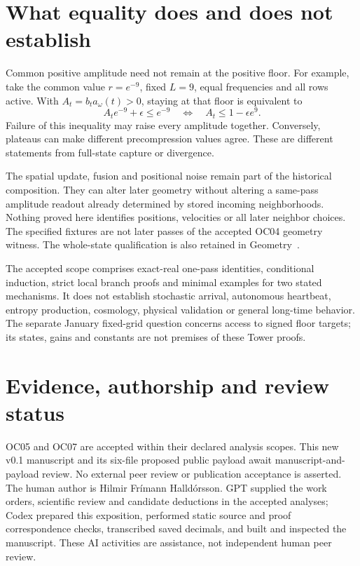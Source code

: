 \documentclass[11pt,a4paper]{article}
\theoremstyle{definition}
\theoremstyle{remark}\newtheorem{remark}[theorem]{Remark}
\numberwithin{equation}{section}
\begin{document}
\section{What equality does and does not establish}\label{sec:limits}
Common positive amplitude need not remain at the positive floor. For example, take
the common value $r=e^{-9}$, fixed $L=9$, equal frequencies and all rows active.
With $A_t=b_ta_\omega(t)>0$, staying at that floor is equivalent to
\begin{equation}\label{eq:floorstay}
 A_t e^{-9}+\epsilon\leq e^{-9}
 \quad\Longleftrightarrow\quad A_t\leq1-\epsilon e^9 .
\end{equation}
Failure of this inequality may raise every amplitude together.
Conversely, plateaus can make different precompression values agree.
These are different statements from full-state capture or divergence.

The spatial update, fusion and positional noise remain part of the historical
composition. They can alter later geometry without altering a same-pass amplitude
readout already determined by stored incoming neighborhoods. Nothing proved here
identifies positions, velocities or all later neighbor choices.
The specified fixtures are not later passes of the accepted OC04 geometry witness. The whole-state qualification is also retained in Geometry~\cite{Geometry}.

The accepted scope comprises exact-real one-pass identities, conditional induction,
strict local branch proofs and minimal examples for two stated mechanisms.
It does not establish stochastic arrival, autonomous heartbeat, entropy production,
cosmology, physical validation or general long-time behavior.
The separate January fixed-grid question concerns access to signed floor targets;
its states, gains and constants are not premises of these Tower proofs.

\section{Evidence, authorship and review status}\label{sec:evidence}
OC05 and OC07 are accepted within their declared analysis scopes. This new v0.1
manuscript and its six-file proposed public payload await manuscript-and-payload
review. No external peer review or publication acceptance is asserted.
The human author is Hilmir Frímann Halldórsson. GPT supplied the work orders,
scientific review and candidate deductions in the accepted analyses; Codex prepared
this exposition, performed static source and proof correspondence checks, transcribed
saved decimals, and built and inspected the manuscript. These AI activities are
assistance, not independent human peer review.
\end{document}
